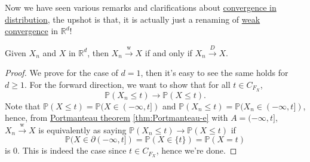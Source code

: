 Now we have seen various remarks and clarifications about \hyperref[def:converge-in-distribution]{convergence in distribution}, the upshot is that, it is actually just a renaming of \hyperref[def:weak-convergence]{weak convergence} in \(\mathbb{R} ^d\)!

\begin{theorem}\label{thm:weak-convergence-is-convergence-in-distribution}
	Given \(X_n\) and \(X\) in \(\mathbb{R} ^d\), then \(X_n \overset{\text{w} }{\to } X\) if and only if \(X_n \overset{D}{\to } X\).
\end{theorem}
\begin{proof}\let\qed\relax
	We prove for the case of \(d = 1\), then it's easy to see the same holds for \(d \geq 1\). For the forward direction, we want to show that for all \(t \in C_{F_X}\),
	\[
		\mathbb{P} (X_n \leq t) \to \mathbb{P} (X \leq t).
	\]
	Note that \(\mathbb{P} (X \leq t) = \mathbb{P} (X \in (-\infty , t])\) and \(\mathbb{P} (X_n \leq t) = \mathbb{P} (X_n \in (-\infty , t])\), hence, from \hyperref[thm:Portmanteau]{Portmanteau theorem} \autoref{thm:Portmanteau-e} with \(A = (-\infty , t]\), \(X_n \overset{\text{w} }{\to } X\) is equivalently as saying \(\mathbb{P} (X_n \leq t) \to \mathbb{P} (X \leq t)\) if
	\[
		\mathbb{P} (X \in \partial (-\infty , t])
		= \mathbb{P} (X \in \{ t \} )
		= \mathbb{P} (X = t)
	\]
	is \(0\). This is indeed the case since \(t \in C_{F_X}\), hence we're done.


\end{proof}
